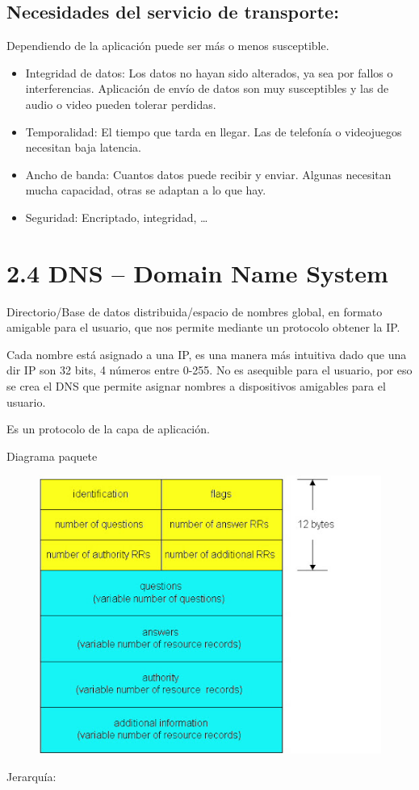 \documentclass[12pt, twoside, openright]{report} %
\begin{document}
\subsection{Necesidades del servicio de transporte:}

Dependiendo de la aplicación puede ser más o menos susceptible.

\begin{itemize}
	\item Integridad de datos: Los datos no hayan sido alterados, ya sea por
	      fallos o interferencias. Aplicación de envío de datos son muy
	      susceptibles y las de audio o video pueden tolerar perdidas.
	\item Temporalidad: El tiempo que tarda en llegar. Las de telefonía o
	      videojuegos necesitan baja latencia.
	\item Ancho de banda: Cuantos datos puede recibir y enviar. Algunas
	      necesitan mucha capacidad, otras se adaptan a lo que hay.
	\item Seguridad: Encriptado, integridad, \ldots{}
\end{itemize}

\section{2.4 DNS -- Domain Name System}

Directorio/Base de datos distribuida/espacio de nombres global, en
formato amigable para el usuario, que nos permite mediante un
protocolo obtener la IP.

Cada nombre está asignado a una IP, es una manera más intuitiva
dado que una dir IP son 32 bits, 4 números entre 0-255. No es
asequible para el usuario, por eso se crea el DNS que permite
asignar nombres a dispositivos amigables para el usuario.

Es un protocolo de la capa de aplicación.

Diagrama paquete
\begin{figure}[H]
	{\includegraphics[scale=.4]{Untitled.jpeg}}
\end{figure}
Jerarquía:
\end{document}
